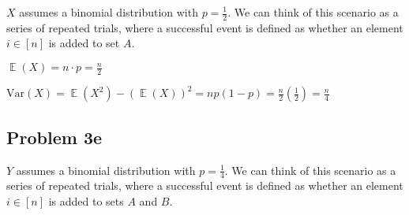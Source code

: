 \documentclass{article}
\newcommand{\Var}{\mathrm{Var}}
\DeclareMathOperator{\EX}{\mathbb{E}}
\begin{document}
$X$ assumes a binomial distribution with $p = \frac{1}{2}$. We can think of this scenario as a series of repeated trials, where a successful event is defined as whether an element $i \in [n]$ is added to set $A$.

\noindent $\EX(X) = n \cdot p = \boxed{\frac{n}{2}}$

\noindent $\Var(X) = \EX(X^2) - (\EX(X))^2 = np(1 - p) = \frac{n}{2}\left(\frac{1}{2}\right) = \boxed{\frac{n}{4}}$

\subsection{Problem 3e}

$Y$ assumes a binomial distribution with $p = \frac{1}{4}$. We can think of this scenario as a series of repeated trials, where a successful event is defined as whether an element $i \in [n]$ is added to sets $A$ and $B$.
\end{document}
